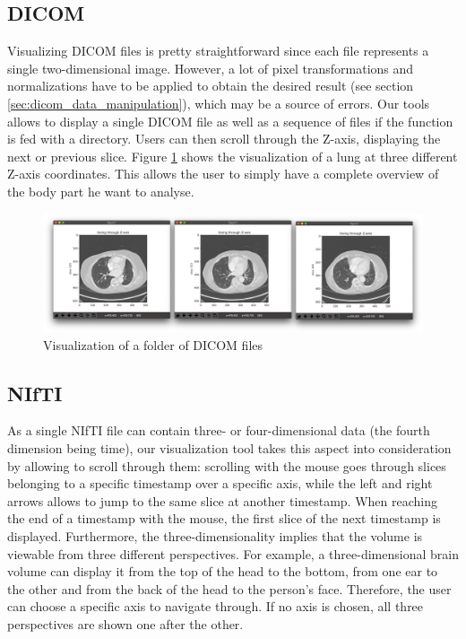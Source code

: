 \subsection{DICOM}
\setlength{\marginparwidth}{3cm}\leavevmode {}Visualizing DICOM files is pretty straightforward since each file represents a single two-dimensional image. However, a lot of pixel transformations and normalizations have to be applied to obtain the desired result (see section \ref{sec:dicom_data_manipulation}), which may be a source of errors. Our tools allows to display a single DICOM file as well as a sequence of files if the function is fed with a directory. Users can then scroll through the Z-axis, displaying the next or previous slice.  Figure \ref{fig:visualize_lung_dcm} shows the visualization of a lung at three different Z-axis coordinates. This allows the user to simply have a complete overview of the body part he want to analyse.

\begin{figure}[!h]
\centering
\includegraphics[width=\textwidth, keepaspectratio=true]{./figures/visualize_lung_dcm.png}
\caption{Visualization of a folder of DICOM files}
\label{fig:visualize_lung_dcm}
\end{figure}


\subsection{NIfTI}
\setlength{\marginparwidth}{3cm}\leavevmode {}As a single NIfTI file can contain three- or four-dimensional data (the fourth dimension being time), our visualization tool takes this aspect into consideration by allowing to scroll through them: scrolling with the mouse goes through slices belonging to a specific timestamp over a specific axis, while the left and right arrows allows to jump to the same slice at another timestamp. When reaching the end of a timestamp with the mouse, the first slice of the next timestamp is displayed. Furthermore, the three-dimensionality implies that the volume is viewable from three different perspectives. For example, a three-dimensional brain volume can display it from the top of the head to the bottom, from one ear to the other and from the back of the head to the person's face. Therefore, the user can choose a specific axis to navigate through. If no axis is chosen, all three perspectives are shown one after the other.

